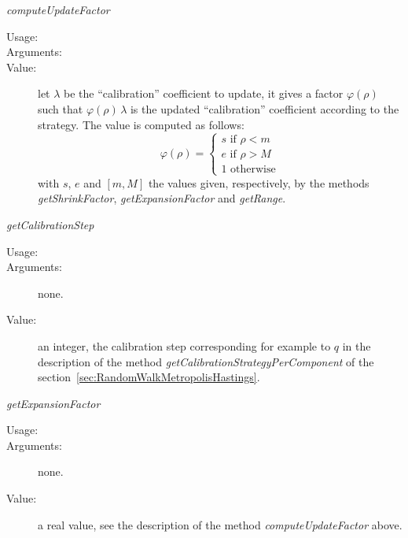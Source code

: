 \begin{description}
\item \textit{computeUpdateFactor}
\begin{description}
\item[Usage:] \rule{0pt}{1em}
\item[Arguments:] \rule{0pt}{1em}
\item[Value:] let $\lambda$ be the ``calibration'' coefficient to update,
it gives a factor $\varphi(\rho)$ such that $\varphi(\rho)\,\lambda$ is the updated
``calibration'' coefficient according to the strategy.
The value is computed as follows:
\begin{equation}
\varphi(\rho) = \left\{ \begin{array}{l}
s \mbox{ if } \rho < m\\
e \mbox{ if } \rho > M\\
1 \mbox{ otherwise}
\end{array} \right.
\end{equation}
with $s$, $e$ and $[m,M]$ the values given, respectively, by the methods
\textit{getShrinkFactor}, \textit{getExpansionFactor} and \textit{getRange}.
\end{description}
\bigskip

\item \textit{getCalibrationStep}
\begin{description}
\item[Usage:] \rule{0pt}{1em}
\item[Arguments:] none. \rule{0pt}{1em}
\item[Value:] an integer, the calibration step corresponding for example to
$q$ in the description of the method \textit{getCalibrationStrategyPerComponent} of the
section~\ref{sec:RandomWalkMetropolisHastings}.
\end{description}
\bigskip

\item \textit{getExpansionFactor}
\begin{description}
\item[Usage:] \rule{0pt}{1em}
\item[Arguments:] none. \rule{0pt}{1em}
\item[Value:] a real value, see the description of the method
\textit{computeUpdateFactor} above.
\end{description}
\bigskip


\end{description}
